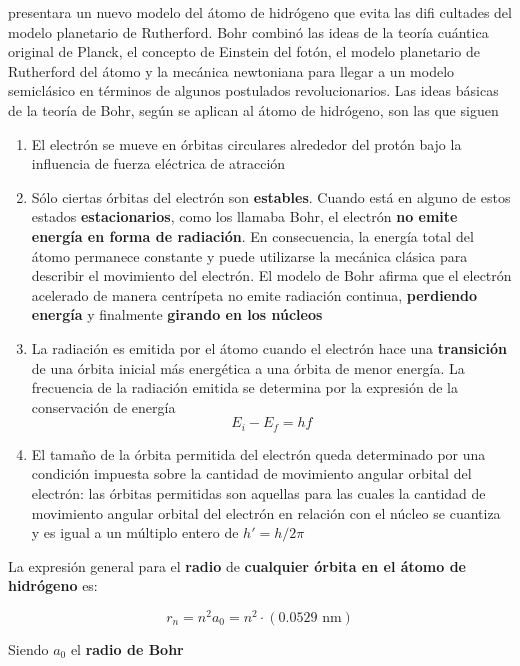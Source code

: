 \documentclass[10pt]{article}
\begin{document}
presentara un nuevo modelo del átomo de hidrógeno que evita las difi cultades del modelo planetario de Rutherford. Bohr combinó las ideas de la teoría cuántica original de Planck, el concepto de Einstein del fotón, el modelo planetario de Rutherford del átomo y la mecánica newtoniana para llegar a un modelo semiclásico en términos de algunos postulados revolucionarios.  Las ideas básicas de la teoría de Bohr, según se aplican al átomo de hidrógeno, son las que siguen
\begin{enumerate}
	\item El electrón se mueve en órbitas circulares alrededor del protón bajo la influencia de fuerza eléctrica de atracción
	\item Sólo ciertas órbitas del electrón son \textbf{estables}. Cuando está en alguno de estos estados \textbf{estacionarios}, como los llamaba Bohr, el electrón \textbf{no emite energía en forma de radiación}. En consecuencia, la energía total del átomo permanece constante y puede utilizarse la mecánica clásica para describir el movimiento del electrón. El modelo de Bohr afirma que el electrón acelerado de manera centrípeta no emite radiación continua, \textbf{perdiendo energía} y finalmente \textbf{girando en los núcleos}
	\item La radiación es emitida por el átomo cuando el electrón hace una \textbf{transición} de una órbita inicial más energética a una órbita de menor energía.  La frecuencia de la radiación emitida se determina por la expresión de la conservación de energía \begin{equation*}
		E_i -E_f = hf
	\end{equation*}
	\item  El tamaño de la órbita permitida del electrón queda determinado por una condición impuesta sobre la cantidad de movimiento angular orbital del electrón: las órbitas permitidas son aquellas para las cuales la cantidad de movimiento angular
orbital del electrón en relación con el núcleo se cuantiza y es igual a un múltiplo entero de $h' = h/2\pi$
\end{enumerate}

La expresión general para el \textbf{radio} de \textbf{cualquier órbita en el átomo de hidrógeno} es:

\begin{equation*}
	r_n = n^2 a_0 = n^2 \cdot (0.052 9 \text{ nm})
\end{equation*}

Siendo $a_0$ el \textbf{radio de Bohr}
\end{document}
